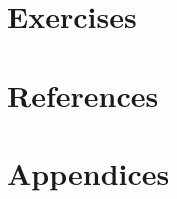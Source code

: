 \documentclass[10pt, a4paper]{report}
\begin{document}


\tableofcontents

\newpage

\newpage
\section{Exercises} \label{sec4}

\newpage

\newpage

\newpage

\newpage

\newpage

\section{References} \label{sec7}

\newpage
\section{Appendices} \label{sec8}

\end{document}
